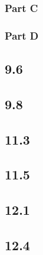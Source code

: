 \documentclass[12pt,titlepage]{extarticle}
\begin{document}
\subsubsection*{Part C}


\subsubsection*{Part D}

\subsection*{9.6}
\subsection*{9.8}

\subsection*{11.3}
\subsection*{11.5}

\subsection*{12.1}
\subsection*{12.4}
\end{document}
